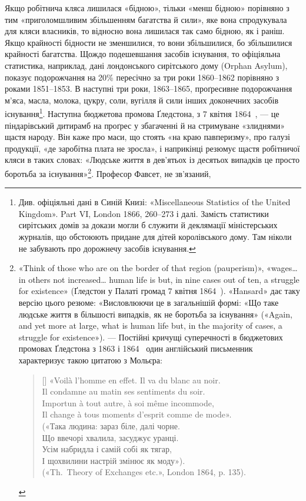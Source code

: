 Якщо робітнича кляса лишилася «бідною», тільки «менш
бідною» порівняно з тим «приголомшливим збільшенням багатства
й сили», яке вона спродукувала для кляси власників, то
відносно вона лишилася так само бідною, як і раніш. Якщо
крайності бідности не зменшилися, то вони збільшилися, бо
збільшилися крайності багатства. Щождо подешевшання засобів
існування, то офіціяльна статистика, наприклад, дані лондонського
сирітського дому (Orphan Asylum), показує подорожчання
на 20\% пересічно за три роки 1860--1862 порівняно з роками
1851--1853. В наступні три роки, 1863--1865, проґресивне
подорожчання м’яса, масла, молока, цукру, соли, вугілля й
сили інших доконечних засобів існування\footnote{
Див. офіціяльні дані в Синій Книзі: «Miscellaneous Statistics
of the United Kingdom». Part VI, London 1866, \stor{}260--273 і далі.
Замість статистики сирітських домів за докази могли б служити й деклямації
міністерських журналів, що обстоюють придане для дітей королівського
дому. Там ніколи не забувають про дорожнечу засобів існування.
}. Наступна бюджетова
промова Ґледстона, з 7 квітня 1864~, — це піндарівський
дитирамб на проґрес у збагаченні й на стримуване «злиднями»
щастя народу. Він каже про маси, що стоять «на краю
павперизму», про галузі продукції, «де заробітна плата не
зросла», і наприкінці резюмує щастя робітничої кляси в таких
словах: «Людське життя в дев’ятьох із десятьох випадків це
просто боротьба за
існування»\footnote{\label{footnote-105}«Think of those who
are on the border of that region (pauperism)»,
«wages\dots{} in others not increased\dots{} human life is but, in nine cases out of ten,
a struggle for existence» (Ґледстон у Палаті громад 7 квітня 1864~).
«Hansard» дає таку версію цього резюме: «Висловлюючи це в загальнішій
формі: «Що таке людське життя в більшості випадків, як не боротьба
за існування» («Again, and yet more at large, what is human life but,
in the majority of cases, a struggle for existence»). — Постійні кричущі суперечності
в бюджетових промовах Ґледстона з 1863 і 1864~ один англійський
письменник характеризує такою цитатою з Мольєра:

\settowidth{\versewidth}{Il change à tous moments d’esprit comme de mode».}
\begin{verse}[\versewidth]
«Voilà l’homme en effet. Il va du blanc au noir. \\
Il condamne au matin ses sentiments du soir. \\
Importun à tout autre, à soi même incommode, \\
Il change à tous moments d’esprit comme de mode». \\
\smallskip
(«Така людина: зараз біле, далі чорне. \\
Що ввечорі хвалила, засуджує уранці. \\
Усім набридла і самій собі як тягар, \\
І щохвилини настрій змінює як моду»). \\
\smallskip
(«Th.~Theory of Exchanges etc.», London 1864, p. 135).
\end{verse}

}. Професор Фавсет, не зв’язаний,
